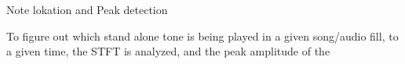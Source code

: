 Note lokation and Peak detection

To figure out which stand alone tone is being played in a given song/audio fill, to a given time, the STFT is analyzed, and the peak amplitude of the 